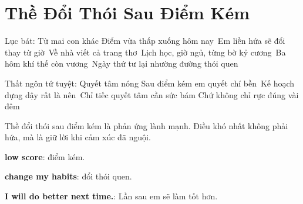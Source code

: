 \chapter{Thề Đổi Thói Sau Điểm Kém}

\begin{lucbatbox}{Lục bát: Từ mai con khác}
Điểm vừa thấp xuống hôm nay\
Em liền hứa sẽ đổi thay từ giờ\
Về nhà viết cả trang thơ\
Lịch học, giờ ngủ, từng bờ kỷ cương\
Ba hôm khí thế còn vương\
Ngày thứ tư lại nhường đường thói quen
\end{lucbatbox}

\begin{tutuyetbox}{Thất ngôn tứ tuyệt: Quyết tâm nóng}
Sau điểm kém em quyết chí bền\
Kế hoạch dựng dậy rất là nên\
Chỉ tiếc quyết tâm cần sức bám
Chứ không chỉ rực đúng vài đêm
\end{tutuyetbox}

\begin{ghichu}
Thề đổi thói sau điểm kém là phản ứng lành mạnh. Điều khó nhất không phải hứa, mà là giữ lời khi cảm xúc đã nguội.
\end{ghichu}

\begin{englishnote}
\textbf{low score}: điểm kém.\par
\textbf{change my habits}: đổi thói quen.\par
\textbf{I will do better next time.}: Lần sau em sẽ làm tốt hơn.
\end{englishnote}